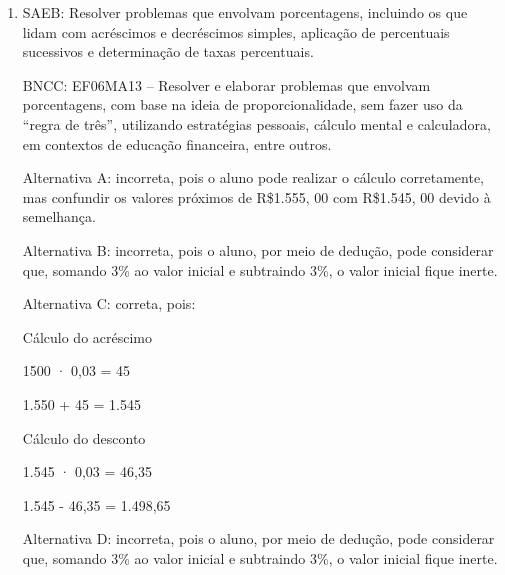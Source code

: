 \begin{enumerate}
		\item SAEB: Resolver problemas que envolvam porcentagens, incluindo os que
lidam com acréscimos e decréscimos simples, aplicação de percentuais
sucessivos e determinação de taxas percentuais.

BNCC: EF06MA13 -- Resolver e elaborar problemas que envolvam
porcentagens, com base na ideia de proporcionalidade, sem fazer uso da
``regra de três'', utilizando estratégias pessoais, cálculo mental e
calculadora, em contextos de educação financeira, entre outros.

Alternativa A: incorreta, pois o aluno pode realizar o cálculo
corretamente, mas confundir os valores próximos de R\$1.555, 00 com
R\$1.545, 00 devido à semelhança.

Alternativa B: incorreta, pois o aluno, por meio de dedução, pode
considerar que, somando 3\% ao valor inicial e subtraindo 3\%, o valor
inicial fique inerte.

Alternativa C: correta, pois:

Cálculo do acréscimo

1500 · 0,03 = 45

1.550 + 45 = 1.545

Cálculo do desconto

1.545 · 0,03 = 46,35

1.545 - 46,35 = 1.498,65

Alternativa D: incorreta, pois o aluno, por meio de dedução, pode
considerar que, somando 3\% ao valor inicial e subtraindo 3\%, o valor
inicial fique inerte.
	
	\end{enumerate}


